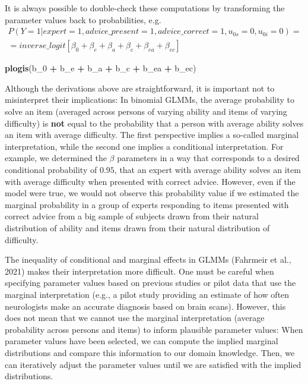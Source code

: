 \documentclass[
  man,floatsintext]{apa6}
\newenvironment{Shaded}{\begin{snugshade}}{\end{snugshade}}
\newcommand{\FunctionTok}[1]{\textcolor[rgb]{0.13,0.29,0.53}{\textbf{#1}}}
\newcommand{\NormalTok}[1]{#1}
\newcommand{\SpecialCharTok}[1]{\textcolor[rgb]{0.81,0.36,0.00}{\textbf{#1}}}
\begin{document}
It is always possible to double-check these computations by transforming the parameter values back to probabilities, e.g.~
\[
\begin{aligned}
P(Y=1|expert = 1, advice\_present = 1, advice\_correct = 1, u_{0s} = 0, u_{0i} = 0) = \\
= inverse\_logit[\beta_0 + \beta_e + \beta_a + \beta_c + \beta_{ea} + \beta_{ec}]
\end{aligned}
\]

\begin{Shaded}
\begin{Highlighting}[]
\FunctionTok{plogis}\NormalTok{(b\_0 }\SpecialCharTok{+}\NormalTok{ b\_e }\SpecialCharTok{+}\NormalTok{ b\_a }\SpecialCharTok{+}\NormalTok{ b\_c }\SpecialCharTok{+}\NormalTok{ b\_ea }\SpecialCharTok{+}\NormalTok{ b\_ec)}
\end{Highlighting}
\end{Shaded}

Although the derivations above are straightforward, it is important not to misinterpret their implications: In binomial GLMMs, the average probability to solve an item (averaged across persons of varying ability and items of varying difficulty) is \textbf{not} equal to the probability that a person with average ability solves an item with average difficulty. The first perspective implies a so-called marginal interpretation, while the second one implies a conditional interpretation. For example, we determined the \(\beta\) parameters in a way that corresponds to a desired conditional probability of \(0.95\), that an expert with average ability solves an item with average difficulty when presented with correct advice. However, even if the model were true, we would not observe this probability value if we estimated the marginal probability in a group of experts responding to items presented with correct advice from a big sample of subjects drawn from their natural distribution of ability and items drawn from their natural distribution of difficulty.

The inequality of conditional and marginal effects in GLMMs (Fahrmeir et al., 2021) makes their interpretation more difficult. One must be careful when specifying parameter values based on previous studies or pilot data that use the marginal interpretation (e.g., a pilot study providing an estimate of how often neurologists make an accurate diagnosis based on brain scans). However, this does not mean that we cannot use the marginal interpretation (average probability across persons and items) to inform plausible parameter values: When parameter values have been selected, we can compute the implied marginal distributions and compare this information to our domain knowledge. Then, we can iteratively adjust the parameter values until we are satisfied with the implied distributions.
\end{document}
